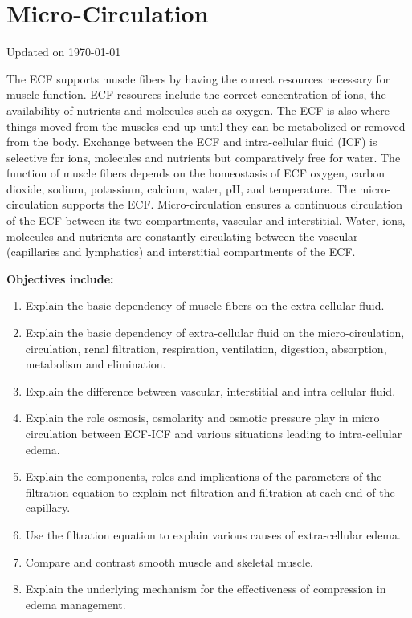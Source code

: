 \chapter{Micro-Circulation}\label{chp:ecf_microcirculation}
Updated on \today
\minitoc

The ECF supports muscle fibers by having the correct resources necessary for muscle function. ECF resources include the correct concentration of ions, the availability of nutrients and molecules such as oxygen. The ECF is also where things moved from the muscles end up until they can be metabolized or removed from the body. Exchange between the ECF and intra-cellular fluid (ICF) is selective for ions, molecules and nutrients but comparatively free for water. The function of muscle fibers depends on the homeostasis of ECF oxygen, carbon dioxide, sodium, potassium, calcium, water, pH, and temperature.
The micro-circulation supports the ECF. Micro-circulation ensures a continuous circulation of the ECF between its two compartments, vascular and interstitial. Water, ions, molecules and nutrients are constantly circulating between the vascular (capillaries and lymphatics) and interstitial compartments of the ECF. 

% 

\vspace{5mm}

\textbf{Objectives include:}
\begin{enumerate}
    \item Explain the basic dependency of muscle fibers on the extra-cellular fluid.
    \item Explain the basic dependency of extra-cellular fluid on the micro-circulation, circulation, renal filtration, respiration, ventilation, digestion, absorption, metabolism and elimination.
    \item Explain the difference between vascular, interstitial and intra cellular fluid.
    \item Explain the role osmosis, osmolarity and osmotic pressure play in micro circulation between ECF-ICF and various situations leading to intra-cellular edema.
    \item Explain the components, roles and implications of the parameters of the filtration equation to explain net filtration and filtration at each end of the capillary.
    \item Use the filtration equation to explain various causes of extra-cellular edema.
    \item Compare and contrast smooth muscle and skeletal muscle.
    \item Explain the underlying mechanism for the effectiveness of compression in edema management.
\end{enumerate}


